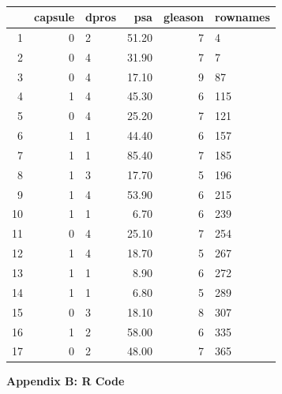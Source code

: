 \documentclass[11pt]{article}\usepackage[]{graphicx}\usepackage[]{color}
\begin{document}
\begin{center}
\begin{table}[ht]
\centering
\begin{tabular}{rrlrrl}
  \hline
 & capsule & dpros & psa & gleason & rownames \\ 
  \hline
1 &   0 & 2 & 51.20 &   7 & 4 \\ 
  2 &   0 & 4 & 31.90 &   7 & 7 \\ 
  3 &   0 & 4 & 17.10 &   9 & 87 \\ 
  4 &   1 & 4 & 45.30 &   6 & 115 \\ 
  5 &   0 & 4 & 25.20 &   7 & 121 \\ 
  6 &   1 & 1 & 44.40 &   6 & 157 \\ 
  7 &   1 & 1 & 85.40 &   7 & 185 \\ 
  8 &   1 & 3 & 17.70 &   5 & 196 \\ 
  9 &   1 & 4 & 53.90 &   6 & 215 \\ 
  10 &   1 & 1 & 6.70 &   6 & 239 \\ 
  11 &   0 & 4 & 25.10 &   7 & 254 \\ 
  12 &   1 & 4 & 18.70 &   5 & 267 \\ 
  13 &   1 & 1 & 8.90 &   6 & 272 \\ 
  14 &   1 & 1 & 6.80 &   5 & 289 \\ 
  15 &   0 & 3 & 18.10 &   8 & 307 \\ 
  16 &   1 & 2 & 58.00 &   6 & 335 \\ 
  17 &   0 & 2 & 48.00 &   7 & 365 \\ 
   \hline
\end{tabular}
\caption{} 
\label{outlier_obs}
\end{table}

\end{center}


\clearpage
\newpage
\noindent \Large{{\bf Appendix B: R Code}}

\end{document}
